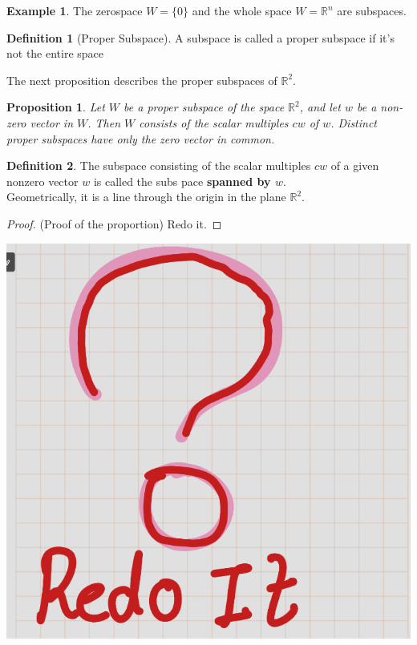 \documentclass[
]{book}
\newtheorem{proposition}{Proposition}[chapter]
\theoremstyle{definition}
\newtheorem{definition}{Definition}[chapter]
\theoremstyle{definition}
\newtheorem{example}{Example}[chapter]
\theoremstyle{definition}
\theoremstyle{definition}
\theoremstyle{remark}
\begin{document}
\begin{example}
\protect\hypertarget{exm:unnamed-chunk-67}{}\label{exm:unnamed-chunk-67}The zerospace \(W = \{0\}\) and the whole space \(W = \mathbb{R}^n\) are subspaces.
\end{example}

\begin{definition}[Proper Subspace]
\protect\hypertarget{def:unnamed-chunk-68}{}\label{def:unnamed-chunk-68}A subspace is called a proper subspace if it's not the entire space
\end{definition}

The next proposition describes the proper subspaces of \(\mathbb{R}^2\).

\begin{proposition}
\protect\hypertarget{prp:unnamed-chunk-69}{}\label{prp:unnamed-chunk-69}Let \(W\) be a proper subspace of the space \(\mathbb{R}^2\), and let \(w\) be a non-zero vector in \(W\). Then \(W\) consists of the scalar multiples \(cw\) of \(w\). Distinct proper subspaces have only the zero vector in common.
\end{proposition}

\begin{definition}
\protect\hypertarget{def:unnamed-chunk-70}{}\label{def:unnamed-chunk-70}The subspace consisting of the scalar multiples \(cw\) of a given nonzero vector \(w\) is called the subs pace \textbf{spanned by \(w\)}.\\
Geometrically, it is a line through the origin in the plane \(\mathbb{R}^2\).
\end{definition}

\begin{proof}
(Proof of the proportion)
Redo it.
\end{proof}

\includegraphics{figures/ch_2/fig100.png}
\end{document}
